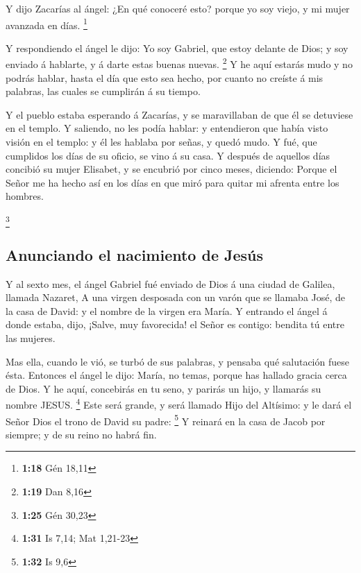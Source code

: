  Y dijo Zacarías al ángel: ¿En qué conoceré esto? porque yo
soy viejo, y mi mujer avanzada en días. \footnote{\textbf{1:18} Gén
  18,11}

 Y respondiendo el ángel le dijo: Yo soy Gabriel, que estoy
delante de Dios; y soy enviado á hablarte, y á darte estas buenas
nuevas. \footnote{\textbf{1:19} Dan 8,16}  Y he aquí
estarás mudo y no podrás hablar, hasta el día que esto sea hecho, por
cuanto no creíste á mis palabras, las cuales se cumplirán á su tiempo.

 Y el pueblo estaba esperando á Zacarías, y se maravillaban
de que él se detuviese en el templo.  Y saliendo, no les
podía hablar: y entendieron que había visto visión en el templo: y él
les hablaba por señas, y quedó mudo.  Y fué, que cumplidos
los días de su oficio, se vino á su casa.  Y después de
aquellos días concibió su mujer Elisabet, y se encubrió por cinco meses,
diciendo:  Porque el Señor me ha hecho así en los días en
que miró para quitar mi afrenta entre los hombres.

\footnote{\textbf{1:25} Gén 30,23}

\hypertarget{anunciando-el-nacimiento-de-jesuxfas}{%
\subsection{Anunciando el nacimiento de
Jesús}\label{anunciando-el-nacimiento-de-jesuxfas}}

 Y al sexto mes, el ángel Gabriel fué enviado de Dios á una
ciudad de Galilea, llamada Nazaret,  A una virgen desposada
con un varón que se llamaba José, de la casa de David: y el nombre de la
virgen era María.  Y entrando el ángel á donde estaba,
dijo, ¡Salve, muy favorecida! el Señor es contigo: bendita tú entre las
mujeres.

 Mas ella, cuando le vió, se turbó de sus palabras, y
pensaba qué salutación fuese ésta.  Entonces el ángel le
dijo: María, no temas, porque has hallado gracia cerca de Dios.
 Y he aquí, concebirás en tu seno, y parirás un hijo, y
llamarás su nombre JESUS. \footnote{\textbf{1:31} Is 7,14; Mat 1,21-23}
 Este será grande, y será llamado Hijo del Altísimo: y le
dará el Señor Dios el trono de David su padre: \footnote{\textbf{1:32}
  Is 9,6}  Y reinará en la casa de Jacob por siempre; y de
su reino no habrá fin.

